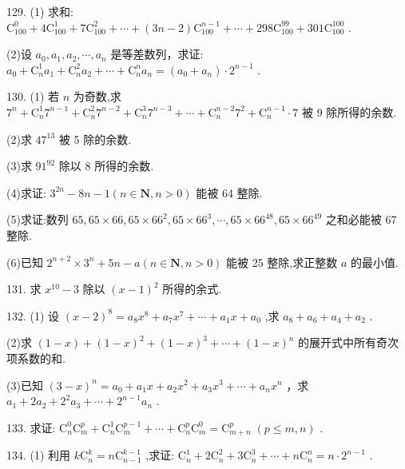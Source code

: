 \documentclass[10pt]{article}
\begin{document}
129. (1) 求和: \({\mathrm{C}}_{100}^{0} + 4{\mathrm{C}}_{100}^{1} + 7{\mathrm{C}}_{100}^{2} + \cdots  + \left( {{3n} - 2}\right) {\mathrm{C}}_{100}^{n - 1} + \cdots  + {298}{\mathrm{C}}_{100}^{99} + {301}{\mathrm{C}}_{100}^{100}\) .

(2)设 \({a}_{0},{a}_{1},{a}_{2},\cdots ,{a}_{n}\) 是等差数列，求证: \({a}_{0} + {\mathrm{C}}_{n}^{1}{a}_{1} + {\mathrm{C}}_{n}^{2}{a}_{2} + \cdots  + {\mathrm{C}}_{n}^{n}{a}_{n} = \left( {{a}_{0} + {a}_{n}}\right)  \cdot  {2}^{n - 1}\) .

130. (1) 若 \(n\) 为奇数,求 \({7}^{n} + {\mathrm{C}}_{n}^{1}{7}^{n - 1} + {\mathrm{C}}_{n}^{2}{7}^{n - 2} + {\mathrm{C}}_{n}^{3}{7}^{n - 3} + \cdots  + {\mathrm{C}}_{n}^{n - 2}{7}^{2} + {\mathrm{C}}_{n}^{n - 1} \cdot  7\) 被 9 除所得的余数.

(2)求 \({47}^{13}\) 被 5 除的余数.

(3)求 \({91}^{92}\) 除以 8 所得的余数.

(4)求证: \({3}^{2n} - {8n} - 1\left( {n \in  \mathbf{N},n > 0}\right)\) 能被 64 整除.

(5)求证:数列 \({65},{65} \times  {66},{65} \times  {66}^{2},{65} \times  {66}^{3},\cdots ,{65} \times  {66}^{48},{65} \times  {66}^{49}\) 之和必能被 67 整除.

(6)已知 \({2}^{n + 2} \times  {3}^{n} + {5n} - a\left( {n \in  \mathbf{N},n > 0}\right)\) 能被 25 整除,求正整数 \(a\) 的最小值.

131. 求 \({x}^{10} - 3\) 除以 \({\left( x - 1\right) }^{2}\) 所得的余式.

132. (1) 设 \({\left( x - 2\right) }^{8} = {a}_{8}{x}^{8} + {a}_{7}{x}^{7} + \cdots  + {a}_{1}x + {a}_{0}\) ,求 \({a}_{8} + {a}_{6} + {a}_{4} + {a}_{2}\) .

(2)求 \(\left( {1 - x}\right)  + {\left( 1 - x\right) }^{2} + {\left( 1 - x\right) }^{3} + \cdots  + {\left( 1 - x\right) }^{n}\) 的展开式中所有奇次项系数的和.

(3)已知 \({\left( 3 - x\right) }^{n} = {a}_{0} + {a}_{1}x + {a}_{2}{x}^{2} + {a}_{3}{x}^{3} + \cdots  + {a}_{n}{x}^{n}\) ，求 \({a}_{1} + 2{a}_{2} + {2}^{2}{a}_{3} + \cdots  + {2}^{n - 1}{a}_{n}\) .

133. 求证: \({\mathrm{C}}_{n}^{0}{\mathrm{C}}_{m}^{p} + {\mathrm{C}}_{n}^{1}{\mathrm{C}}_{m}^{p - 1} + \cdots  + {\mathrm{C}}_{n}^{p}{\mathrm{C}}_{m}^{0} = {\mathrm{C}}_{m + n}^{p}\;\left( {p \leq  m,n}\right)\) .

134. (1) 利用 \(k{\mathrm{C}}_{n}^{k} = n{\mathrm{C}}_{n - 1}^{k - 1}\) ,求证: \({\mathrm{C}}_{n}^{1} + 2{\mathrm{C}}_{n}^{2} + 3{\mathrm{C}}_{n}^{3} + \cdots  + n{\mathrm{C}}_{n}^{n} = n \cdot  {2}^{n - 1}\) .
\end{document}
